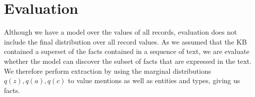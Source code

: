 \documentclass[12pt]{article}
\begin{document}
\section{Evaluation}
Although we have a model over the values of all records,
evaluation does not include the final distribution over all record values.
As we assumed that the KB contained a superset of the facts contained in
a sequence of text, we are evaluate whether the model can discover the subset of facts that 
are expressed in the text.
We therefore perform extraction by using the marginal distributions
$q(z),q(a),q(c)$ to value mentions as well as entities and types,
giving us facts.



\begin{comment}
\section{Three perspectives on training}
We can either train $q$ directly on the conditional task
or train it to mimic the posterior of a suitable generative model.

Axes of objectives:
\begin{enumerate}
\item Proposal distribution: Learned or uniform (or some prior)
\item Probabilistic interpretation: Marginal likelihood or KL
\item Probabilistic interpretation 2: Approximate posterior
    of a generative model or learn directly.
\end{enumerate}

\subsection{Marginal loss}
Our first loss, the marginal likelihood, takes the form of
$$\mcL_{\textrm{ML}} = \sum_t \log \sum_{a_t} \sum_{c_t} q(a_t,c_t,v_{a_t})$$
where the unobserved alignments and latent copy are marginalized over.
This has the interpretation of maximizing the `softmax' of the 
log probabilities, where softmax is from the physics usage
as a smooth approximation to the max.
However, the sharpness of is limited by the choice of $q$.
With a uniform $q(a,c)$, $\mcL = \sum_t \sum_{a_t}q(v_{a_t}) + C$,
where $C$ is the normalization term which we can assume to be constant here.
The gradient of this term wrt the log probabilities is weighted by the posterior,
so a high entropy $q$ will result in a smaller gradient.


\end{comment}
\end{document}
